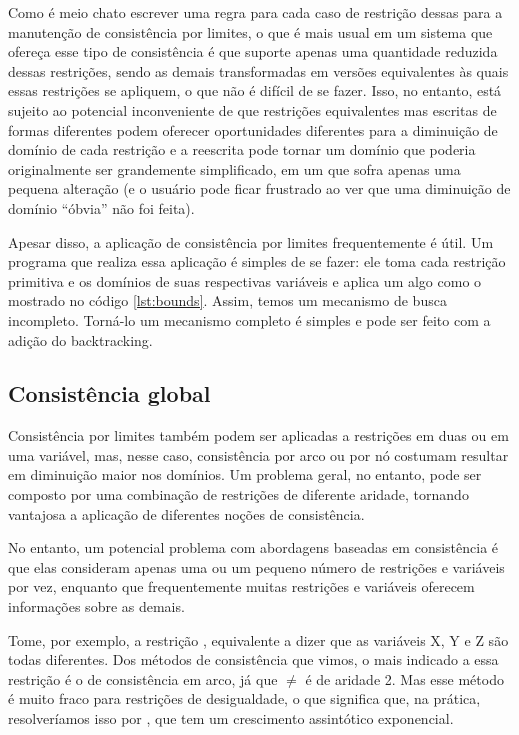 \documentclass{article}
\begin{document}
Como é meio chato escrever uma regra para cada caso de restrição dessas para a manutenção de consistência por limites, o que é
mais usual em um sistema que ofereça esse tipo de consistência é que suporte apenas uma quantidade reduzida dessas restrições,
sendo as demais transformadas em versões equivalentes às quais essas restrições se apliquem, o que não é difícil de se fazer.
Isso, no entanto, está sujeito ao potencial inconveniente de que restrições equivalentes mas escritas de formas diferentes podem oferecer
oportunidades diferentes para a diminuição de domínio de cada restrição e a reescrita pode tornar um domínio que poderia
originalmente ser grandemente simplificado, em um que sofra apenas uma pequena alteração (e o
usuário pode ficar frustrado ao ver que uma diminuição de domínio ``óbvia'' não foi feita).

Apesar disso, a aplicação de consistência por limites frequentemente é útil. Um programa que realiza essa aplicação é simples
de se fazer: ele toma cada restrição primitiva e os domínios de suas respectivas variáveis e aplica um algo como o mostrado no
código \ref{lst:bounds}. Assim, temos um mecanismo de busca incompleto. Torná-lo um mecanismo completo é simples e pode ser feito
com a adição do backtracking.


\subsection{Consistência global}

Consistência por limites também podem ser aplicadas a restrições em duas ou em uma variável, mas, nesse caso, consistência por
arco ou por nó costumam resultar em diminuição maior nos domínios. Um problema geral, no entanto, pode ser composto por uma
combinação de restrições de diferente aridade, tornando vantajosa a aplicação de diferentes noções de consistência.

No entanto, um potencial problema com abordagens baseadas em consistência é que elas consideram apenas uma ou um pequeno número de
restrições e variáveis por vez, enquanto que frequentemente muitas restrições e variáveis oferecem informações sobre as demais.

Tome, por exemplo, a restrição , equivalente a dizer que as variáveis X, Y e Z são todas
diferentes. Dos métodos de consistência que vimos, o mais indicado a essa restrição é o de consistência em arco, já que $\neq$ é
de aridade 2. Mas esse método é muito fraco para restrições de desigualdade, o que significa que, na
prática, resolveríamos isso por , que tem um crescimento assintótico exponencial.%
\end{document}
